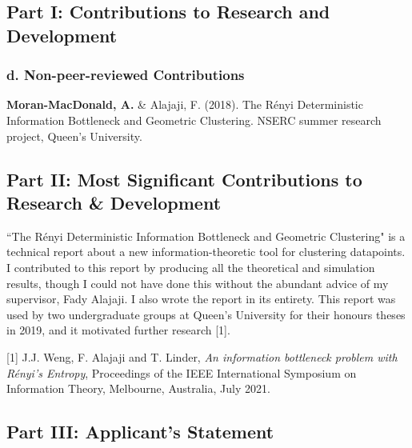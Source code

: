\documentclass[a4paper,12pt]{article}
\begin{document}
\subsection*{Part I: Contributions to Research and Development}
\subsubsection*{d. Non-peer-reviewed Contributions}
\textbf{Moran-MacDonald, A.} \& Alajaji, F. (2018). The R\'{e}nyi Deterministic
Information Bottleneck and Geometric Clustering. NSERC summer research project,
Queen's University.

\subsection*{Part II: Most Significant Contributions to Research \& Development}
``The R\'{e}nyi Deterministic Information Bottleneck and Geometric
Clustering" is a technical report about a new information-theoretic tool for
clustering datapoints.
I contributed to this report by producing all the theoretical and simulation
results, though I could not have done this without the abundant advice of my
supervisor, Fady Alajaji. 
I also wrote the report in its entirety.
This report was used by two undergraduate groups at Queen's University for their
honours theses in 2019, and it motivated further research [1].

[1] J.J. Weng, F. Alajaji and T. Linder, \textit{An information bottleneck
problem with R\'{e}nyi's Entropy}, Proceedings of the IEEE International
Symposium on Information Theory, Melbourne, Australia, July 2021.

\subsection*{Part III: Applicant's Statement}
\end{document}

